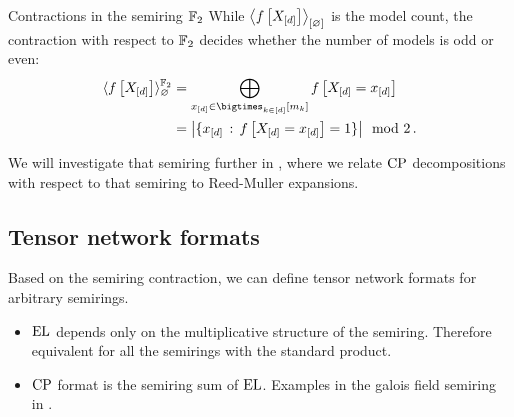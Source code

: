 \begin{example}{Contractions in the semiring $\mathbb{F}_2$}
    While $\left\langle f\left[X_{[d]}\right]\right\rangle_{\left[ \varnothing \right]}$ is the model count, the contraction with respect to $\mathbb{F}_2$ decides whether the number of models is odd or even:
    \begin{align*}
        \srcontractionwrt{\formulawith}{\galoissemiring}
        &= \bigoplus_{\shortcatindicesin} \formulaat{\indexedshortcatvariables} \\
        &= \cardof{\{\shortcatindices \wcols \formulaat{\indexedshortcatvariables}=1\}} \modspace 2 \, .
    \end{align*}
\end{example}


We will investigate that semiring further in , where we relate $\mathrm{CP}$ decompositions with respect to that semiring to Reed-Muller expansions.

\subsection{Tensor network formats}

Based on the semiring contraction, we can define tensor network formats for arbitrary semirings.
\begin{itemize}
    \item $\mathrm{EL}$ depends only on the multiplicative structure of the semiring. Therefore equivalent for all the semirings with the standard product.
    \item $\mathrm{CP}$ format is the semiring sum of $\mathrm{EL}$. Examples in the galois field semiring in .
\end{itemize}

